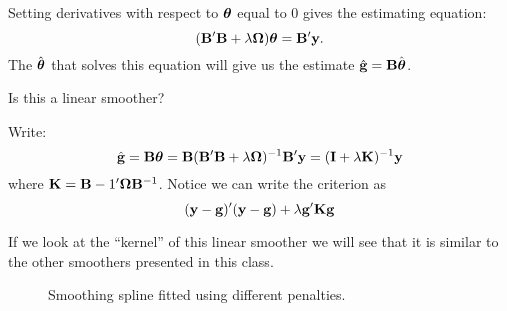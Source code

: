 Setting derivatives with respect to $\mbox{\boldmath $\theta$\unboldmath}$ equal to 0 gives
the estimating equation:
\[
({\mathbf B}'{\mathbf B} + \lambda\mbox{\boldmath $\Omega$\unboldmath})\mbox{\boldmath $\theta$\unboldmath} = {\mathbf B}'{\mathbf y}.
\]
The $\hat{\mbox{\boldmath $\theta$\unboldmath}}$ that solves this equation will give us the
estimate $\hat{{\mathbf g}} = {\mathbf B} \hat{\mbox{\boldmath $\theta$\unboldmath}}$.

Is this a linear smoother?

Write:
\[
\hat{{\mathbf g}} = {\mathbf B} \mbox{\boldmath $\theta$\unboldmath} = {\mathbf B}({\mathbf B}'{\mathbf B} + \lambda \mbox{\boldmath $\Omega$\unboldmath})^{-1}
{\mathbf B}'{\mathbf y} =  ({\mathbf I} + \lambda {\mathbf K})^{-1}{\mathbf y}
\]
where ${\mathbf K} = {\mathbf B} -1 ' \mbox{\boldmath $\Omega$\unboldmath} {\mathbf B}^{-1}$. Notice we can
write the criterion as
\[
({\mathbf y} - {\mathbf g})'({\mathbf y} - {\mathbf g}) + \lambda {\mathbf g}' {\mathbf K} {\mathbf g}
\]

If we look at the ``kernel'' of this linear smoother we will see that
it is similar to the other smoothers presented in this class.

\begin{figure}[h] 
\centerline{}
\caption{Smoothing spline fitted using different penalties.}
\end{figure}


